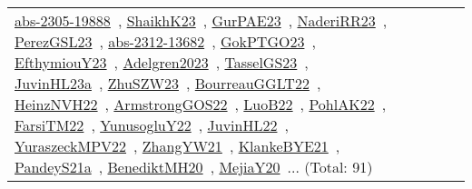 {\begin{longtable}{lp{3cm}>{\raggedright\arraybackslash}p{6cm}>{\raggedright\arraybackslash}p{6cm}>{\raggedright\arraybackslash}p{8cm}}
\href{../works/abs-2305-19888.pdf}{abs-2305-19888}~\cite{abs-2305-19888}, \href{../works/ShaikhK23.pdf}{ShaikhK23}~\cite{ShaikhK23}, \href{../works/GurPAE23.pdf}{GurPAE23}~\cite{GurPAE23}, \href{../works/NaderiRR23.pdf}{NaderiRR23}~\cite{NaderiRR23}, \href{../works/PerezGSL23.pdf}{PerezGSL23}~\cite{PerezGSL23}, \href{../works/abs-2312-13682.pdf}{abs-2312-13682}~\cite{abs-2312-13682}, \href{../works/GokPTGO23.pdf}{GokPTGO23}~\cite{GokPTGO23}, \href{../works/EfthymiouY23.pdf}{EfthymiouY23}~\cite{EfthymiouY23}, \href{../works/Adelgren2023.pdf}{Adelgren2023}~\cite{Adelgren2023}, \href{../works/TasselGS23.pdf}{TasselGS23}~\cite{TasselGS23}, \href{../works/JuvinHL23a.pdf}{JuvinHL23a}~\cite{JuvinHL23a}, \href{../works/ZhuSZW23.pdf}{ZhuSZW23}~\cite{ZhuSZW23}, \href{../works/BourreauGGLT22.pdf}{BourreauGGLT22}~\cite{BourreauGGLT22}, \href{../works/HeinzNVH22.pdf}{HeinzNVH22}~\cite{HeinzNVH22}, \href{../works/ArmstrongGOS22.pdf}{ArmstrongGOS22}~\cite{ArmstrongGOS22}, \href{../works/LuoB22.pdf}{LuoB22}~\cite{LuoB22}, \href{../works/PohlAK22.pdf}{PohlAK22}~\cite{PohlAK22}, \href{../works/FarsiTM22.pdf}{FarsiTM22}~\cite{FarsiTM22}, \href{../works/YunusogluY22.pdf}{YunusogluY22}~\cite{YunusogluY22}, \href{../works/JuvinHL22.pdf}{JuvinHL22}~\cite{JuvinHL22}, \href{../works/YuraszeckMPV22.pdf}{YuraszeckMPV22}~\cite{YuraszeckMPV22}, \href{../works/ZhangYW21.pdf}{ZhangYW21}~\cite{ZhangYW21}, \href{../works/KlankeBYE21.pdf}{KlankeBYE21}~\cite{KlankeBYE21}, \href{../works/PandeyS21a.pdf}{PandeyS21a}~\cite{PandeyS21a}, \href{../works/BenediktMH20.pdf}{BenediktMH20}~\cite{BenediktMH20}, \href{../works/MejiaY20.pdf}{MejiaY20}~\cite{MejiaY20}... (Total: 91)\\

\end{longtable}}
